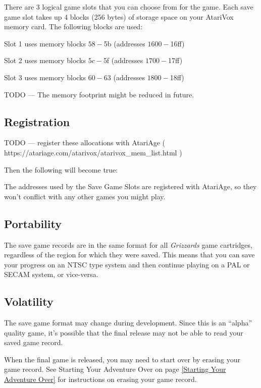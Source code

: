 \documentclass[10pt,twoside,openright]{memoir}
\begin{document}
There are 3 logical game slots that you can choose from for the
game. Each save game slot takes up 4 blocks (256 bytes) of storage
space on your AtariVox memory card. The following blocks are used:

\begin{enumeration}
\item Slot 1 uses memory blocks $58-$5b (addresses $1600-$16ff)
\item Slot 2 uses memory blocks $5c-$5f (addresses $1700-$17ff)
\item Slot 3 uses memory blocks $60-$63 (addresses $1800-$18ff)
\end{enumeration}

TODO --- The memory footprint might be reduced in future.

\subsection{Registration}

TODO --- register these allocations with AtariAge (
https://atariage.com/atarivox/atarivox\_mem\_list.html )

Then the following will become true:

The addresses used by the Save Game Slots are registered with
AtariAge, so they won't conflict with any other games you might play.

\subsection{Portability}

The save game records are in the same format for all \emph{Grizzards} game
cartridges, regardless of the region for which they were saved.  This means
that you can save your progress on an NTSC type system and then continue
playing on a PAL or SECAM system, or vice-versa.

\subsection{Volatility}

The save game format may change during development. Since this is an
``alpha'' quality game, it's possible that the final release may not
be able to read your saved game record.

When the final game is released, you may need to start over by erasing
your game record. See Starting Your Adventure Over on page
\ref{Starting Your Adventure Over} for instructions on erasing your
game record.
\end{document}
